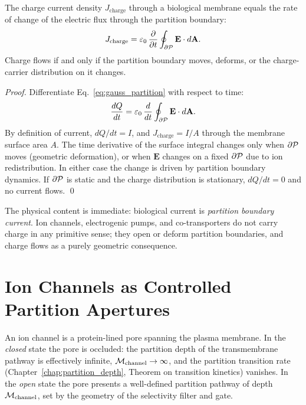 \begin{theorem}
\label{thm:partition_boundary_current}
The charge current density $J_{\mathrm{charge}}$ through a biological
membrane equals the rate of change of the electric flux through the
partition boundary:
\begin{equation}
  J_{\mathrm{charge}} = \varepsilon_0\,\frac{\partial}{\partial t}
    \oint_{\partial\mathcal{P}} \mathbf{E} \cdot d\mathbf{A}.
  \label{eq:partition_current}
\end{equation}
Charge flows if and only if the partition boundary moves, deforms, or the
charge-carrier distribution on it changes.
\end{theorem}

\begin{proof}
Differentiate Eq.~\eqref{eq:gauss_partition} with respect to time:
\begin{equation}
  \frac{dQ}{dt}
    = \varepsilon_0\,\frac{d}{dt}\oint_{\partial\mathcal{P}} \mathbf{E} \cdot d\mathbf{A}.
\end{equation}
By definition of current, $dQ/dt = I$, and $J_{\mathrm{charge}} = I/A$
through the membrane surface area $A$. The time derivative of the surface
integral changes only when $\partial\mathcal{P}$ moves (geometric deformation),
or when $\mathbf{E}$ changes on a fixed $\partial\mathcal{P}$ due to ion
redistribution. In either case the change is driven by partition boundary
dynamics. If $\partial\mathcal{P}$ is static and the charge distribution is
stationary, $dQ/dt = 0$ and no current flows. \qed
\end{proof}

The physical content is immediate: biological current is \emph{partition
boundary current}. Ion channels, electrogenic pumps, and co-transporters
do not carry charge in any primitive sense; they open or deform partition
boundaries, and charge flows as a purely geometric consequence.

\section{Ion Channels as Controlled Partition Apertures}
\label{sec:ion_channels}

An ion channel is a protein-lined pore spanning the plasma membrane.
In the \emph{closed} state the pore is occluded: the partition depth of the
transmembrane pathway is effectively infinite, $\mathcal{M}_{\mathrm{channel}} \to \infty$,
and the partition transition rate (Chapter~\ref{chap:partition_depth},
Theorem on transition kinetics) vanishes. In the \emph{open} state the pore
presents a well-defined partition pathway of depth $\mathcal{M}_{\mathrm{channel}}$,
set by the geometry of the selectivity filter and gate.


